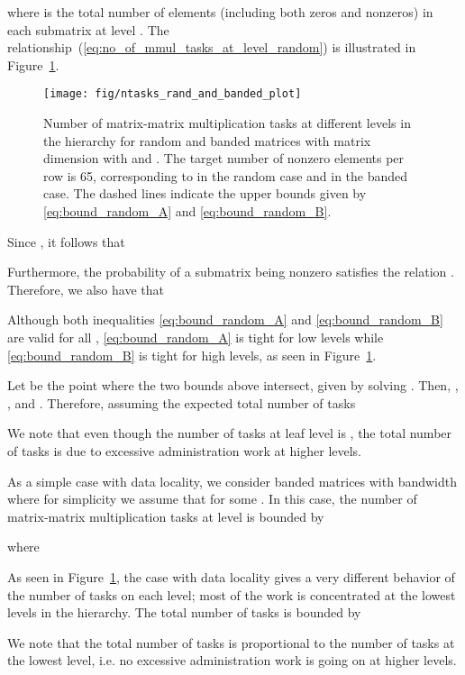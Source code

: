 \documentclass{elsarticle}
\begin{document}
where  is the total number of elements (including
both zeros and nonzeros) in each submatrix at level .  The
relationship~(\ref{eq:no_of_mmul_tasks_at_level_random}) is
illustrated in Figure~\ref{fig:ntasks_rand_and_banded}.

\begin{figure}
  \begin{center}
    \texttt{[image: fig/ntasks\_rand\_and\_banded\_plot]}
  \end{center}
  \caption{Number of matrix-matrix multiplication tasks at different
    levels in the hierarchy for random and banded matrices with matrix
    dimension  with  and .  The target number of
    nonzero elements per row is 65, corresponding to 
    in the random case and  in the banded case.  The dashed lines
    indicate the upper bounds given by \eqref{eq:bound_random_A} and
    \eqref{eq:bound_random_B}. \label{fig:ntasks_rand_and_banded}}
\end{figure}


Since , it follows that 

Furthermore, the
probability  of a submatrix being nonzero satisfies the relation
. Therefore, we also have that 

Although both inequalities \eqref{eq:bound_random_A} and
\eqref{eq:bound_random_B} are valid for all ,
\eqref{eq:bound_random_A} is tight for low levels while
\eqref{eq:bound_random_B} is tight for high levels, as seen in
Figure~\ref{fig:ntasks_rand_and_banded}.

Let  be the point where the two
bounds above intersect, given by solving . Then, 
,
, and
. Therefore,
assuming  the expected total number of tasks

We note that even though the number of tasks at leaf level is
, the total number of tasks is
 due to excessive administration work at
higher levels.

As a simple case with data locality, we consider banded matrices with
bandwidth  where for simplicity we assume that 
for some . In this case, the number of matrix-matrix
multiplication tasks at level  is bounded by

where


As seen in Figure~\ref{fig:ntasks_rand_and_banded}, the case with data
locality gives a very different behavior of the number of tasks on
each level; most of the work is concentrated at the lowest levels in
the hierarchy.
The total number of tasks is bounded by 

We note that the total number of tasks is proportional to the number
of tasks at the lowest level, i.e. no excessive administration work is
going on at higher levels.
\end{document}
